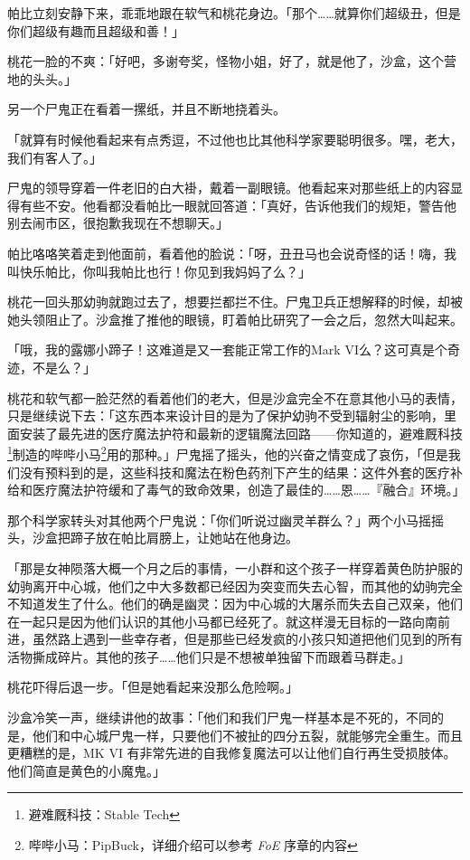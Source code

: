 帕比立刻安静下来，乖乖地跟在软气和桃花身边。「那个……就算你们超级丑，但是你们超级有趣而且超级和善！」

桃花一脸的不爽：「好吧，多谢夸奖，怪物小姐，好了，就是他了，沙盒，这个营地的头头。」

另一个尸鬼正在看着一摞纸，并且不断地挠着头。

「就算有时候他看起来有点秀逗，不过他也比其他科学家要聪明很多。嘿，老大，我们有客人了。」

尸鬼的领导穿着一件老旧的白大褂，戴着一副眼镜。他看起来对那些纸上的内容显得有些不安。他看都没看帕比一眼就回答道：「真好，告诉他我们的规矩，警告他别去闹市区，很抱歉我现在不想聊天。」

帕比咯咯笑着走到他面前，看着他的脸说：「呀，丑丑马也会说奇怪的话！嗨，我叫快乐帕比，你叫我帕比也行！你见到我妈妈了么？」

桃花一回头那幼驹就跑过去了，想要拦都拦不住。尸鬼卫兵正想解释的时候，却被她头领阻止了。沙盒推了推他的眼镜，盯着帕比研究了一会之后，忽然大叫起来。

「哦，我的露娜小蹄子！这难道是又一套能正常工作的Mark
VI么？这可真是个奇迹，不是么？」

桃花和软气都一脸茫然的看着他们的老大，但是沙盒完全不在意其他小马的表情，只是继续说下去：「这东西本来设计目的是为了保护幼驹不受到辐射尘的影响，里面安装了最先进的医疗魔法护符和最新的逻辑魔法回路——你知道的，避难厩科技\footnote{避难厩科技：Stable Tech}制造的哔哔小马\footnote{哔哔小马：PipBuck，详细介绍可以参考 \emph{FoE} 序章的内容}用的那种。」尸鬼摇了摇头，他的兴奋之情变成了哀伤，「但是我们没有预料到的是，这些科技和魔法在粉色药剂下产生的结果：这件外套的医疗补给和医疗魔法护符缓和了毒气的致命效果，创造了最佳的……恩……『融合』环境。」

那个科学家转头对其他两个尸鬼说：「你们听说过幽灵羊群么？」两个小马摇摇头，沙盒把蹄子放在帕比肩膀上，让她站在他身边。

「那是女神陨落大概一个月之后的事情，一小群和这个孩子一样穿着黄色防护服的幼驹离开中心城，他们之中大多数都已经因为突变而失去心智，而其他的幼驹完全不知道发生了什么。他们的确是幽灵：因为中心城的大屠杀而失去自己双亲，他们在一起只是因为他们认识的其他小马都已经死了。就这样漫无目标的一路向南前进，虽然路上遇到一些幸存者，但是那些已经发疯的小孩只知道把他们见到的所有活物撕成碎片。其他的孩子……他们只是不想被单独留下而跟着马群走。」

桃花吓得后退一步。「但是她看起来没那么危险啊。」

沙盒冷笑一声，继续讲他的故事：「他们和我们尸鬼一样基本是不死的，不同的是，他们和中心城尸鬼一样，只要他们不被扯的四分五裂，就能够完全重生。而且更糟糕的是，MK VI 有非常先进的自我修复魔法可以让他们自行再生受损肢体。他们简直是黄色的小魔鬼。」

